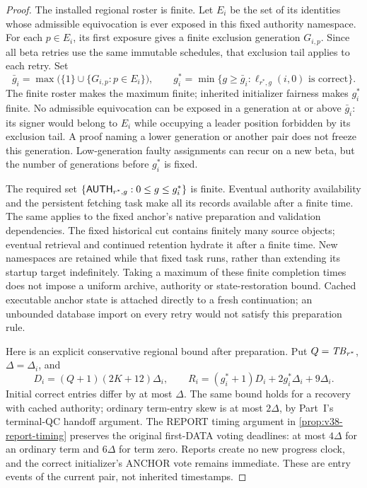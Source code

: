 \begin{proof}
The installed regional roster is finite. Let $E_i$ be the set of its
identities whose admissible equivocation is ever exposed in this fixed
authority namespace. For each $p\in E_i$, its first exposure gives a
finite exclusion generation $G_{i,p}$. Since all beta retries use the
same immutable schedules, that exclusion tail applies to each retry.
Set
\[
 \bar g_i=\max\bigl(\{1\}\cup\{G_{i,p}:p\in E_i\}\bigr),\qquad
 g_i^*=\min\{g\ge\bar g_i:
                   \ell_{r^*,g}(i,0)\text{ is correct}\}.
\]
The finite roster makes the maximum finite; inherited initializer
fairness makes $g_i^*$ finite. No admissible equivocation can be exposed
in a generation at or above $\bar g_i$: its signer would belong to
$E_i$ while occupying a leader position forbidden by its exclusion
tail. A proof naming a lower generation or another pair does not freeze
this generation. Low-generation faulty assignments can recur on a new
beta, but the number of generations before $g_i^*$ is fixed.

The required set $\{\mathsf{AUTH}_{r^*,g}:0\le g\le g_i^*\}$ is finite.
Eventual authority availability and the persistent fetching task make
all its records available after a finite time. The same applies to the
fixed anchor's native preparation and validation dependencies. The fixed
historical cut contains finitely many source objects; eventual retrieval
and continued retention hydrate it after a finite time. New namespaces
are retained while that fixed task runs, rather than extending its
startup target indefinitely. Taking a maximum of these finite completion
times does not impose a uniform archive, authority or state-restoration
bound. Cached executable
anchor state is attached directly to a fresh continuation; an unbounded
database import on every retry would not satisfy this preparation rule.

Here is an explicit conservative regional bound after preparation.
Put $Q=\mathit{TB}_{r^*}$, $\Delta=\Delta_i$, and
\[
 D_i=(Q+1)(2K+12)\Delta_i,\qquad
 R_i=(g_i^*+1)D_i+2g_i^*\Delta_i+9\Delta_i.
\]
Initial correct entries differ by at most $\Delta$. The same bound
holds for a recovery with cached authority; ordinary term-entry skew
is at most $2\Delta$, by Part~I's terminal-QC handoff argument. The
REPORT timing argument in \cref{prop:v38-report-timing} preserves the original
first-DATA voting deadlines: at most $4\Delta$ for an ordinary term and
$6\Delta$ for term zero. Reports create no new progress clock, and the
correct initializer's ANCHOR vote remains immediate. These are entry
events of the current pair, not inherited timestamps.


\end{proof}
